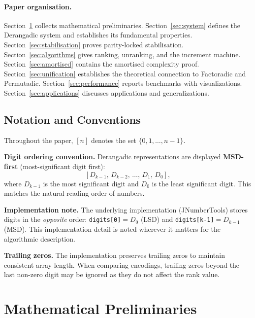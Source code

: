 \documentclass[11pt,a4paper]{article}
\begin{document}
    \paragraph{Paper organisation.}
    Section~\ref{sec:prelim} collects mathematical preliminaries.
    Section~\ref{sec:system} defines the Derangadic system and establishes
    its fundamental properties.
    Section~\ref{sec:stabilisation} proves parity-locked stabilisation.
    Section~\ref{sec:algorithms} gives ranking, unranking, and the increment
    machine.
    Section~\ref{sec:amortised} contains the amortised complexity proof.
    Section~\ref{sec:unification} establishes the theoretical connection to
    Factoradic and Permutadic.
    Section~\ref{sec:performance} reports benchmarks with visualizations.
    Section~\ref{sec:applications} discusses applications and generalizations.

    \subsection*{Notation and Conventions}

    Throughout the paper, $[n]$ denotes the set $\{0,1,\dots,n-1\}$.

    \textbf{Digit ordering convention.} Derangadic representations are displayed
    \textbf{MSD-first} (most-significant digit first):
    \[
        [D_{k-1},\, D_{k-2},\, \dots,\, D_1,\, D_0],
    \]
    where $D_{k-1}$ is the most significant digit and $D_0$ is the least
    significant digit. This matches the natural reading order of numbers.

    \textbf{Implementation note.} The underlying implementation (JNumberTools)
    stores digits in the \emph{opposite} order: \texttt{digits[0]}$= D_0$ (LSD) and
    \texttt{digits[k-1]}$= D_{k-1}$ (MSD). This implementation detail is noted
    wherever it matters for the algorithmic description.

    \textbf{Trailing zeros.} The implementation preserves trailing zeros to maintain
    consistent array length. When comparing encodings, trailing zeros beyond the
    last non-zero digit may be ignored as they do not affect the rank value.

    \section{Mathematical Preliminaries}
    \label{sec:prelim}
\end{document}
